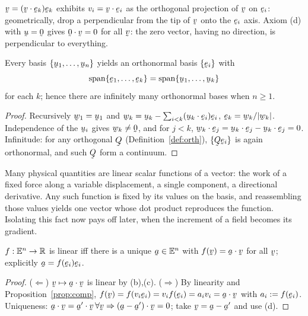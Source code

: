 \begin{remark}\label{rem:proj}
$\bv=(\ip\bv{\be_{k}})\be_{k}$ exhibits $v_{i}=\ip\bv{\be_{i}}$ as the
orthogonal projection of $\bv$ on $\be_{i}$: geometrically, drop a
perpendicular from the tip of $\bv$ onto the $\be_i$ axis. Axiom (d) with
$\bu=\bze$ gives $\ip\bze\bv=0$ for all $\bv$: the zero vector, having no
direction, is perpendicular to everything.
\end{remark}

\begin{proposition}\label{prop:gs}
Every basis $\{\bu_{1},\dots,\bu_{n}\}$ yields an orthonormal basis
$\{\be_{i}\}$ with
\[\operatorname{span}\{\be_{1},\dots,\be_{k}\}
=\operatorname{span}\{\bu_{1},\dots,\bu_{k}\}\]
for each $k$; hence there are
infinitely many orthonormal bases when $n\ge1$.
\end{proposition}

\begin{proof}
Recursively $\bw_{1}=\bu_{1}$ and
$\bw_{k}=\bu_{k}-\sum_{i<k}(\ip{\bu_{k}}{\be_{i}})\be_{i}$,
$\be_{k}=\bw_{k}/|\bw_{k}|$. Independence of the $\bu_i$ gives
$\bw_{k}\neq\bze$, and for $j<k$,
$\ip{\bw_{k}}{\be_{j}}=\ip{\bu_{k}}{\be_{j}}-\ip{\bu_{k}}{\be_{j}}=0$.
Infinitude: for any orthogonal $\bQ$ (Definition~\ref{def:orth}),
$\{\bQ\be_{i}\}$ is again orthonormal, and such $\bQ$ form a continuum.
\end{proof}

Many physical quantities are linear scalar functions of a vector: the work
of a fixed force along a variable displacement, a single component, a
directional derivative. Any such function is fixed by its values on the
basis, and reassembling those values yields one vector whose dot product
reproduces the function. Isolating this fact now pays off later, when the
increment of a field becomes its gradient.

\begin{theorem}\label{thm:riesz}
$f:\mathbb{E}^{n}\to\mathbb{R}$ is linear iff there is a unique $\ba\in\En$ with
$f(\bv)=\ip\ba\bv$ for all $\bv$; explicitly $\ba=f(\be_{i})\be_{i}$.
\end{theorem}

\begin{proof}
($\Leftarrow$) $\bv\mapsto\ip\ba\bv$ is linear by (b),(c).
($\Rightarrow$) By linearity and Proposition~\ref{prop:comp},
$f(\bv)=f(v_{i}\be_{i})=v_{i}f(\be_{i})=a_{i}v_{i}=\ip\ba\bv$ with
$a_{i}:=f(\be_{i})$. Uniqueness: $\ip{\ba}{\bv}=\ip{\ba'}{\bv}\,\forall\bv
\Rightarrow\ip{(\ba-\ba')}{\bv}=0$; take $\bv=\ba-\ba'$ and use (d).
\end{proof}

